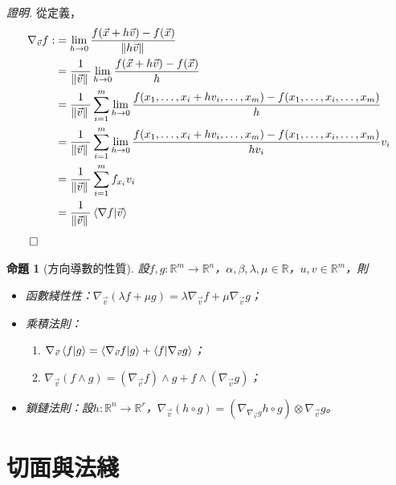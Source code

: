 \documentclass[12pt]{article}
\newtheorem*{proposition}{命題}
\renewenvironment*{proof}{\textit{證明.}}{\hfill$\qed$}
\begin{document}
    \begin{proof}
        從定義，\begin{align*}
            \nabla_{\vec{v}}f:&=\lim_{h\to 0}\frac{f(\vec{x}+h\vec{v})-f(\vec{x})}{\norm*{h\vec{v}}}\\
            &=\frac{1}{\norm*{\vec{v}}}\lim_{h\to 0}\frac{f(\vec{x}+h\vec{v})-f(\vec{x})}{h}\\
            &=\frac{1}{\norm*{\vec{v}}}\sum_{i=1}^{m}\lim_{h\to 0}\frac{f(x_1,\dots,x_i+hv_i,\dots,x_m)-f(x_1,\dots,x_i,\dots,x_m)}{h}\\
            &=\frac{1}{\norm*{\vec{v}}}\sum_{i=1}^{m}\lim_{h\to 0}\frac{f(x_1,\dots,x_i+hv_i,\dots,x_m)-f(x_1,\dots,x_i,\dots,x_m)}{hv_i}v_i\\
            &=\frac{1}{\norm*{\vec{v}}}\sum_{i=1}^{m}f_{x_i}v_i\\
            &=\frac{1}{\norm*{\vec{v}}}\innerproduct{\nabla f}{\vec{v}}\\
        \end{align*}
    \end{proof}

    \begin{proposition}[方向導數的性質]
        設$f,g:\mathbb{R}^m\to\mathbb{R}^n$，$\alpha,\beta,\lambda,\mu\in\mathbb{R}$，$u,v\in\mathbb{R}^m$，則\begin{itemize}
            \item 函數綫性性：$\nabla_{\vec{v}}(\lambda f+\mu g)=\lambda\nabla_{\vec{v}}f+\mu\nabla_{\vec{v}}g$；
            \item 乘積法則：\begin{enumerate}
                \item $\nabla_{\vec{v}}\innerproduct{f}{g}=\innerproduct{\nabla_{\vec{v}}f}{g} +\innerproduct{f}{\nabla_{\vec{v}}g}$；
                \item $\nabla_{\vec{v}}(f\wedge g)=(\nabla_{\vec{v}}f)\wedge g +f\wedge (\nabla_{\vec{v}}g)$；
            \end{enumerate}
            \item 鎖鏈法則：設$h:\mathbb{R}^n\to\mathbb{R}^r$，$\nabla_{\vec{v}}(h\circ g)=(\nabla_{\nabla_{\vec{v}}g}h\circ g)\otimes \nabla_{\vec{v}}g$。
        \end{itemize}
    \end{proposition}

    \section*{切面與法綫}
\end{document}
